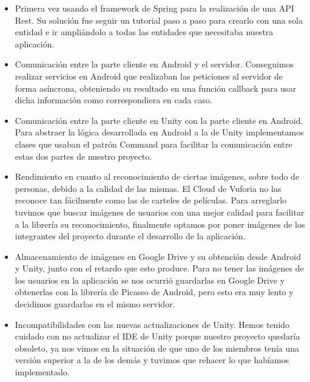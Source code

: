 \begin{itemize}
    \item Primera vez usando el framework de Spring para la realización de una API Rest. Su solución fue seguir un tutorial paso a paso para crearlo con una sola entidad e ir ampliándolo a todas las entidades que necesitaba nuestra aplicación.
    \item Comunicación entre la parte cliente en Android y el servidor. Conseguimos realizar servicios en Android que realizaban las peticiones al servidor de forma asíncrona, obteniendo su resultado en una función callback para usar dicha información como correspondiera en cada caso.
    \item Comunicación entre la parte cliente en Unity con la parte cliente en Android. Para abstraer la lógica desarrollada en Android a la de Unity implementamos clases que usaban el patrón Command para facilitar la comunicación entre estas dos partes de nuestro proyecto.
    \item Rendimiento en cuanto al reconocimiento de ciertas imágenes, sobre todo de personas, debido a la calidad de las mismas. El Cloud de Vuforia no las reconoce tan fácilmente como las de carteles de películas. Para arreglarlo tuvimos que buscar imágenes de usuarios con una mejor calidad para facilitar a la librería su reconocimiento, finalmente optamos por poner imágenes de los integrantes del proyecto durante el desarrollo de la aplicación.
    \item Almacenamiento de imágenes en Google Drive y su obtención desde Android y Unity, junto con el retardo que esto produce. Para no tener las imágenes de los usuarios en la aplicación se nos ocurrió guardarlas en Google Drive y obtenerlas con la librería de Picasso de Android, pero esto era muy lento y decidimos guardarlas en el mismo servidor.
    \item Incompatibilidades con las nuevas actualizaciones de Unity. Hemos tenido cuidado con no actualizar el IDE de Unity porque nuestro proyecto quedaría obsoleto, ya nos vimos en la situación de que uno de los miembros tenía una versión superior a la de los demás y tuvimos que rehacer lo que habíamos implementado.
\end{itemize}
